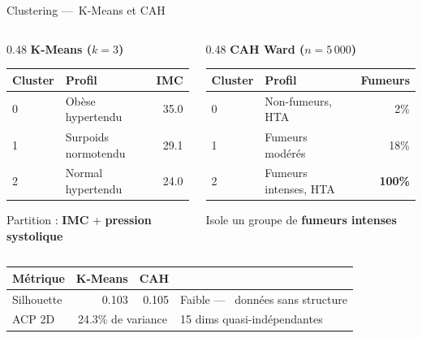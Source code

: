 \documentclass[12pt]{beamer}
\begin{document}
\begin{frame}{Clustering ---~K-Means et CAH}

\small
\begin{columns}[T]
\begin{column}{0.48\textwidth}
\textbf{K-Means ($k=3$)}

\smallskip
\begin{tabular}{llr}
\toprule
Cluster & Profil & IMC \\
\midrule
0 & Obèse hypertendu & 35.0 \\
1 & Surpoids normotendu & 29.1 \\
2 & Normal hypertendu & 24.0 \\
\bottomrule
\end{tabular}

\smallskip
Partition : \textbf{IMC} + \textbf{pression systolique}
\end{column}

\begin{column}{0.48\textwidth}
\textbf{CAH Ward ($n=5\,000$)}

\smallskip
\begin{tabular}{llr}
\toprule
Cluster & Profil & Fumeurs \\
\midrule
0 & Non-fumeurs, HTA & 2\% \\
1 & Fumeurs modérés & 18\% \\
2 & Fumeurs intenses, HTA & \textbf{100\%} \\
\bottomrule
\end{tabular}

\smallskip
Isole un groupe de \textbf{fumeurs intenses}
\end{column}
\end{columns}

\medskip

\begin{tabular}{lrrl}
\toprule
Métrique & K-Means & CAH & \\
\midrule
Silhouette & 0.103 & 0.105 & Faible ---~ données sans structure \\
ACP 2D     & \multicolumn{2}{c}{24.3\% de variance} & 15 dims quasi-indépendantes \\
\bottomrule
\end{tabular}

\end{frame}
\end{document}
